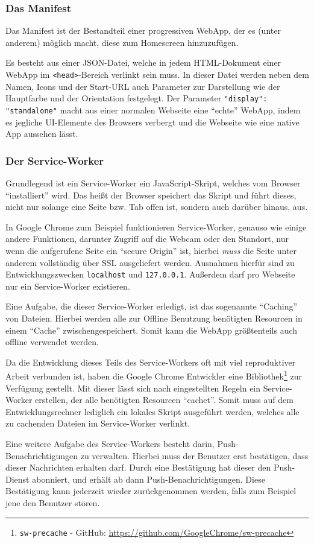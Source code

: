 \documentclass[a4paper,12pt,ngerman]{scrartcl}      %
\providecommand{\inlinecode}[1]{\texttt{#1}}
\begin{document}
	\subsubsection{Das Manifest}
	Das Manifest ist der Bestandteil einer progressiven WebApp, der es (unter anderem) möglich macht, diese zum Homescreen hinzuzufügen.\par
	Es besteht aus einer JSON-Datei, welche in jedem HTML-Dokument einer WebApp im \inlinecode{<head>}-Bereich verlinkt sein muss. In dieser Datei werden neben dem Namen, Icons und der Start-URL auch Parameter zur Darstellung wie der Hauptfarbe und der Orientation festgelegt. Der Parameter \inlinecode{"{}display"{}: "{}standalone"{}} macht aus einer normalen Webseite eine ``echte'' WebApp, indem es jegliche UI-Elemente des Browsers verbergt und die Webseite wie eine native App aussehen lässt.\par
	
	\subsubsection{Der Service-Worker}
	Grundlegend ist ein Service-Worker ein JavaScript-Skript, welches vom Browser ``installiert'' wird. Das heißt der Browser speichert das Skript und führt dieses, nicht nur solange eine Seite bzw. Tab offen ist, sondern auch darüber hinaus, aus.\par
	In Google Chrome zum Beispiel funktionieren Service-Worker, genauso wie einige andere Funktionen, darunter Zugriff auf die Webcam oder den Standort, nur wenn die aufgerufene Seite ein ``secure Origin'' ist, hierbei \emph{muss} die Seite unter anderem vollständig über SSL ausgeliefert werden. Ausnahmen hierfür sind zu Entwicklungszwecken \inlinecode{localhost} und \inlinecode{127.0.0.1}. Außerdem darf pro Webseite nur ein Service-Worker existieren.\par
	Eine Aufgabe, die dieser Service-Worker erledigt, ist das sogenannte ``Caching'' von Dateien. Hierbei werden alle zur Offline Benutzung benötigten Resourcen in einem ``Cache'' zwischengespeichert. Somit kann die WebApp größtenteils auch offline verwendet werden.\par
	Da die Entwicklung dieses Teils des Service-Workers oft mit viel reproduktiver Arbeit verbunden ist, haben die Google Chrome Entwickler eine Bibliothek\footnote{\inlinecode{sw-precache} - GitHub: \url{https://github.com/GoogleChrome/sw-precache}} zur Verfügung gestellt. Mit dieser lässt sich nach eingestellten Regeln ein Service-Worker erstellen, der alle benötigten Resourcen ``cachet''. Somit muss auf dem Entwicklungsrechner lediglich ein lokales Skript ausgeführt werden, welches alle zu cachenden Dateien im Service-Worker verlinkt.\par
	Eine weitere Aufgabe des Service-Workers besteht darin, Push-Be\-nach\-rich\-ti\-gungen zu verwalten. Hierbei muss der Benutzer erst bestätigen, dass dieser Nachrichten erhalten darf. Durch eine Bestätigung hat dieser den Push-Dienst abonniert, und erhält ab dann Push-Benachrichtigungen. Diese Bestätigung kann jederzeit wieder zurückgenommen werden, falls zum Beispiel jene den Benutzer stören.\par
	
\end{document}
